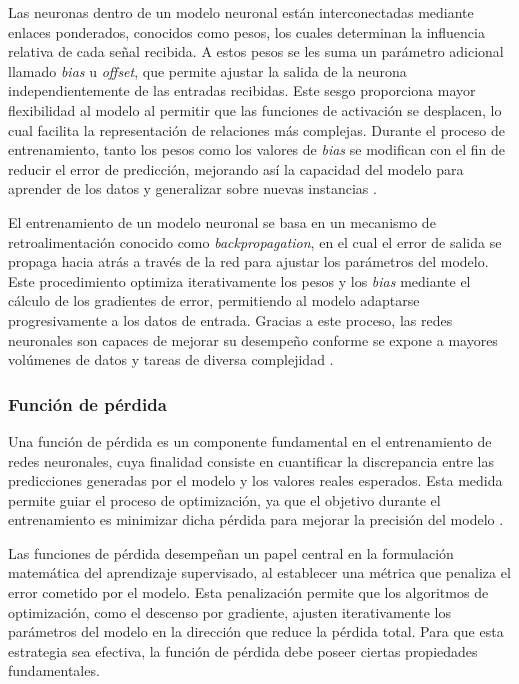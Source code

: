 Las neuronas dentro de un modelo neuronal están interconectadas mediante enlaces ponderados, conocidos como pesos, los cuales determinan la influencia relativa de cada señal recibida. A estos pesos se les suma un parámetro adicional llamado \textit{bias} u \textit{offset}, que permite ajustar la salida de la neurona independientemente de las entradas recibidas. Este sesgo proporciona mayor flexibilidad al modelo al permitir que las funciones de activación se desplacen, lo cual facilita la representación de relaciones más complejas. Durante el proceso de entrenamiento, tanto los pesos como los valores de \textit{bias} se modifican con el fin de reducir el error de predicción, mejorando así la capacidad del modelo para aprender de los datos y generalizar sobre nuevas instancias \cite{haykin2009neural}.

El entrenamiento de un modelo neuronal se basa en un mecanismo de retroalimentación conocido como \textit{backpropagation}, en el cual el error de salida se propaga hacia atrás a través de la red para ajustar los parámetros del modelo. Este procedimiento optimiza iterativamente los pesos y los \textit{bias} mediante el cálculo de los gradientes de error, permitiendo al modelo adaptarse progresivamente a los datos de entrada. Gracias a este proceso, las redes neuronales son capaces de mejorar su desempeño conforme se expone a mayores volúmenes de datos y tareas de diversa complejidad \cite{nielsen2015neural}.


\subsubsection{Función de pérdida}
Una función de pérdida es un componente fundamental en el entrenamiento de redes neuronales, cuya finalidad consiste en cuantificar la discrepancia entre las predicciones generadas por el modelo y los valores reales esperados. Esta medida permite guiar el proceso de optimización, ya que el objetivo durante el entrenamiento es minimizar dicha pérdida para mejorar la precisión del modelo \cite{eitca_loss_function}.

Las funciones de pérdida desempeñan un papel central en la formulación matemática del aprendizaje supervisado, al establecer una métrica que penaliza el error cometido por el modelo. Esta penalización permite que los algoritmos de optimización, como el descenso por gradiente, ajusten iterativamente los parámetros del modelo en la dirección que reduce la pérdida total. Para que esta estrategia sea efectiva, la función de pérdida debe poseer ciertas propiedades fundamentales.

